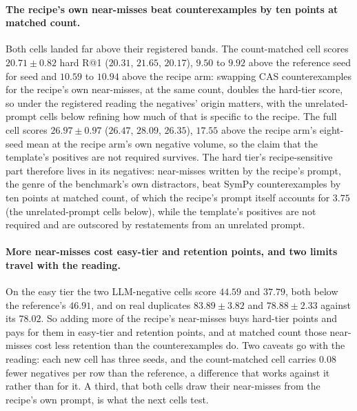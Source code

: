\paragraph{The recipe's own near-misses beat counterexamples by ten points at matched count.}
Both cells landed far above their registered bands. The count-matched cell scores $20.71 \pm 0.82$ hard R@1 ($20.31$, $21.65$, $20.17$), $9.50$ to $9.92$ above the reference seed for seed and $10.59$ to $10.94$ above the recipe arm: swapping CAS counterexamples for the recipe's own near-misses, at the same count, doubles the hard-tier score, so under the registered reading the negatives' origin matters, with the unrelated-prompt cells below refining how much of that is specific to the recipe. The full cell scores $26.97 \pm 0.97$ ($26.47$, $28.09$, $26.35$), $17.55$ above the recipe arm's eight-seed mean at the recipe arm's own negative volume, so the claim that the template's positives are not required survives. The hard tier's recipe-sensitive part therefore lives in its negatives: near-misses written by the recipe's prompt, the genre of the benchmark's own distractors, beat SymPy counterexamples by ten points at matched count, of which the recipe's prompt itself accounts for $3.75$ (the unrelated-prompt cells below), while the template's positives are not required and are outscored by restatements from an unrelated prompt.

\paragraph{More near-misses cost easy-tier and retention points, and two limits travel with the reading.}On the easy tier the two LLM-negative cells score $44.59$ and $37.79$, both below the reference's $46.91$, and on real duplicates $83.89 \pm 3.82$ and $78.88 \pm 2.33$ against its $78.02$. So adding more of the recipe's near-misses buys hard-tier points and pays for them in easy-tier and retention points, and at matched count those near-misses cost less retention than the counterexamples do. Two caveats go with the reading: each new cell has three seeds, and the count-matched cell carries $0.08$ fewer negatives per row than the reference, a difference that works against it rather than for it. A third, that both cells draw their near-misses from the recipe's own prompt, is what the next cells test.

